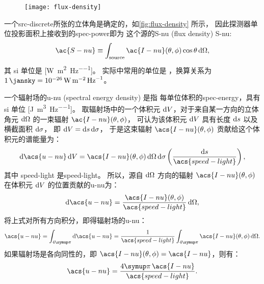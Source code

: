 \begin{figure}[htp]
  \centering
  \texttt{[image: flux-density]}
  \label{fig:flux-density}
\end{figure}

一个\ac{src-discrete}所张的立体角是确定的，如\autoref{fig:flux-density} 所示，
因此探测器单位投影面积上接收到的\ac{spec-power}即为
这个源的\acl{S-nu} (flux density) \ac{S-nu}:
\begin{equation}
  \label{eq:flux-density}
  \ac{S-nu} \equiv
    \int_{\R{source}} \ac{I-nu}(\theta,\phi) \cos\theta \,\D{\Omega} ,
\end{equation}
其 \ac{si} 单位是 [\si{\watt\per\square\meter\per\hertz}]。
实际中常用的单位是 \si{\jansky}，换算关系为
$\SI{1}{\jansky} = \SI{e-26}{\watt\per\square\meter\per\hertz}$。

一个辐射场的\acl{u-nu} (spectral energy density) 是指
每单位体积的\ac{spec-energy}，具有 \ac{si} 单位
[\si{\joule\per\cubic\meter\per\hertz}]。
取辐射场中的一个体积元 $\mathrm{d}V$，对于来自某一方向的立体角元 $\mathrm{d}\Omega$
的一束辐射 $\ac{I-nu}(\theta,\phi)$，
可认为该体积元 $\mathrm{d}V$ 具有长度 $\mathrm{d}s$ 以及横截面积 $\mathrm{d}\sigma$，
即 $\mathrm{d}V = \mathrm{d}s\,\mathrm{d}\sigma$，
于是这束辐射 $\acs{I-nu}(\theta,\phi)$ 贡献给这个体积元的谱能量为：
\begin{equation}
  \D{\acs{u-nu}}\,\D{V}
    = \acs{I-nu}(\theta,\phi) \,\D{\Omega}\,\D{\sigma}
      \left( \frac{\D{s}}{\acs{speed-light}} \right) ,
\end{equation}
其中 \acs{speed-light} 是\acl{speed-light}。
所以，源自 $\mathrm{d}\Omega$ 方向的辐射 $\acs{I-nu}(\theta,\phi)$
在体积元 $\mathrm{d}V$ 的位置贡献的\acl{u-nu}为：
\begin{equation}
  \D{\acs{u-nu}}
    = \frac{\acs{I-nu}(\theta,\phi)}{\acs{speed-light}} \,\D{\Omega} ,
\end{equation}
将上式对所有方向积分，即得辐射场的\acl{u-nu}：
\begin{equation}
  \label{eq:spectral-energy-density}
  \acs{u-nu}
    = \int_{4\Cpi} \D{\acs{u-nu}}
    = \frac{1}{\acs{speed-light}}
      \int_{4\Cpi} \acs{I-nu}(\theta,\phi) \,\D{\Omega} .
\end{equation}
如果辐射场是各向同性的，即 $\acs{I-nu}(\theta,\phi) = \acs{I-nu}$，则有：
\begin{equation}
  \label{eq:spectral-energy-density-iso}
  \acs{u-nu} = \frac{4\Cpi \, \acs{I-nu}}{\acs{speed-light}} .
\end{equation}


